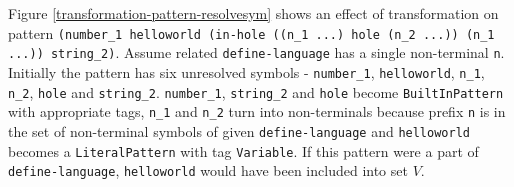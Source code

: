 Figure \ref{transformation-pattern-resolvesym} shows an effect of transformation on pattern \texttt{(number\_1 helloworld (in-hole ((n\_1 ...) hole (n\_2 ...)) (n\_1 ...)) string\_2)}. Assume related \texttt{define-language} has a single non-terminal \texttt{n}. Initially the pattern has six unresolved symbols - \texttt{number\_1}, \texttt{helloworld}, \texttt{n\_1}, \texttt{n\_2}, \texttt{hole} and \texttt{string\_2}. \texttt{number\_1}, \texttt{string\_2} and \texttt{hole} become \texttt{BuiltInPattern} with appropriate tags,  \texttt{n\_1} and \texttt{n\_2} turn into non-terminals because prefix \texttt{n} is in the set of non-terminal symbols of given \texttt{define-language} and \texttt{helloworld} becomes a \texttt{LiteralPattern} with tag \texttt{Variable}. If this pattern were a part of \texttt{define-language}, \texttt{helloworld} would have been included into set $V$.
